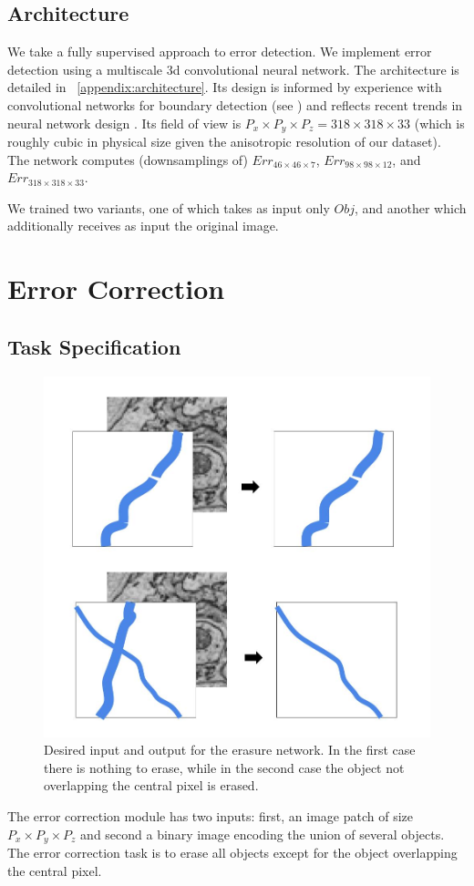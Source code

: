 \documentclass{article}
\begin{document}
\subsection{Architecture}
We take a fully supervised approach to error detection. We implement error detection using a multiscale 3d convolutional neural network. The architecture is detailed in ~\ref{appendix:architecture}. Its design is informed by experience with convolutional networks for boundary detection (see \cite{kisuk}) and reflects recent trends in neural network design \cite{unet,resnet}. Its field of view is $P_x\times P_y\times P_z=318\times 318\times 33$ (which is roughly cubic in physical size given the anisotropic resolution of our dataset). The network computes (downsamplings of) $Err_{46 \times 46 \times 7}$, $Err_{98 \times 98 \times 12}$, and $Err_{318 \times 318 \times 33}$.

We trained two variants, one of which takes as input only $Obj$, and another which additionally receives as input the original image. 

\section{Error Correction}
\subsection{Task Specification}
\begin{figure}
\begin{center}
	\includegraphics[width=0.65\linewidth]{correction_task.jpg}
	\caption{Desired input and output for the erasure network. In the first case there is nothing to erase, while in the second case the object not overlapping the central pixel is erased.}
	\label{fig:error_correction_cartoon}
\end{center}
\end{figure}
The error correction module has two inputs: first, an image patch of size $P_x\times P_y\times P_z$ and second a binary image encoding the union of several objects. The error correction task is to erase all objects except for the object overlapping the central pixel.
\end{document}
